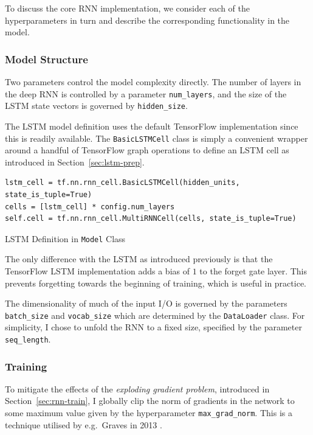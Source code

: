 \documentclass[12pt,a4paper,twoside,openright]{report}
\begin{document}
To discuss the core RNN implementation, we consider each of the hyperparameters
in turn and describe the corresponding functionality in the model.

\subsubsection{Model Structure}

Two parameters control the model complexity directly. The number of layers in
the deep RNN is controlled by a parameter \texttt{num\_layers}, and the size of
the LSTM state vectors is governed by \texttt{hidden\_size}.

The LSTM model definition uses the default TensorFlow implementation since this
is readily available. The \texttt{BasicLSTMCell} class is simply a convenient
wrapper around a handful of TensorFlow graph operations to define an LSTM cell
as introduced in Section~\ref{sec:lstm-prep}. 

\begin{listing}
  \begin{verbatim}
lstm_cell = tf.nn.rnn_cell.BasicLSTMCell(hidden_units, state_is_tuple=True)
cells = [lstm_cell] * config.num_layers
self.cell = tf.nn.rnn_cell.MultiRNNCell(cells, state_is_tuple=True)
  \end{verbatim}
  \caption{LSTM Definition in \texttt{Model} Class}
\end{listing}

The only difference with the LSTM as introduced previously is that the
TensorFlow LSTM implementation adds a bias of $1$ to the forget gate layer. This
prevents forgetting towards the beginning of training, which is useful in
practice.

The dimensionality of much of the input I/O is governed by the parameters
\texttt{batch\_size} and \texttt{vocab\_size} which are determined by the
\texttt{DataLoader} class. For simplicity, I chose to unfold the RNN to a fixed
size, specified by the parameter \texttt{seq\_length}.

\subsubsection{Training}

To mitigate the effects of the \emph{exploding gradient problem}, introduced in
Section~\ref{sec:rnn-train}, I globally clip the norm of gradients in the
network to some maximum value given by the hyperparameter
\texttt{max\_grad\_norm}. This is a technique utilised by e.g.\ Graves in 2013
\cite{graves2013generating}.
\end{document}
